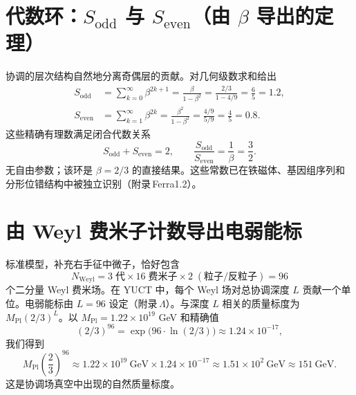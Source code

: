 \documentclass[12pt,a4paper]{article}
\begin{document}
	\section{代数环：\(S_{\mathrm{odd}}\) 与 \(S_{\mathrm{even}}\)（由 \(\beta\) 导出的定理）}
	\label{sec:algebraic-loop}
	
	协调的层次结构自然地分离奇偶层的贡献。对几何级数求和给出
	\begin{align}
		S_{\mathrm{odd}} &= \sum_{k=0}^{\infty} \beta^{2k+1} = \frac{\beta}{1-\beta^{2}} = \frac{2/3}{1 - 4/9} = \frac{6}{5} = 1.2, \label{eq:sodd}\\
		S_{\mathrm{even}} &= \sum_{k=1}^{\infty} \beta^{2k} = \frac{\beta^{2}}{1-\beta^{2}} = \frac{4/9}{5/9} = \frac{4}{5} = 0.8. \label{eq:seven}
	\end{align}
	这些精确有理数满足闭合代数关系
	\begin{equation}
		\boxed{S_{\mathrm{odd}} + S_{\mathrm{even}} = 2, \qquad \frac{S_{\mathrm{odd}}}{S_{\mathrm{even}}} = \frac{1}{\beta} = \frac{3}{2}}.
		\label{eq:algebraic-loop}
	\end{equation}
	无自由参数；该环是 \(\beta = 2/3\) 的直接结果。这些常数已在铁磁体、基因组序列和分形位错结构中被独立识别（附录 Ferra1.2）。
	
	\section{由 Weyl 费米子计数导出电弱能标}
	
	标准模型，补充右手征中微子，恰好包含
	\begin{equation}
		N_{\mathrm{Weyl}} = 3\;\text{代} \times 16\;\text{费米子} \times 2\;(\text{粒子/反粒子}) = 96
	\end{equation}
	个二分量 Weyl 费米场。在 YUCT 中，每个 Weyl 场对总协调深度 \(L\) 贡献一个单位。电弱能标由 \(L = 96\) 设定（附录 \(\Lambda\)）。与深度 \(L\) 相关的质量标度为 \(M_{\mathrm{Pl}} (2/3)^{L}\)。以 \(M_{\mathrm{Pl}} = 1.22 \times 10^{19}\) GeV 和精确值
	\begin{equation}
		(2/3)^{96} = \exp\bigl(96 \cdot \ln(2/3)\bigr) \approx 1.24 \times 10^{-17},
	\end{equation}
	我们得到
	\begin{equation}
		M_{\mathrm{Pl}} \left(\frac{2}{3}\right)^{96} \approx 1.22 \times 10^{19}\ \mathrm{GeV} \times 1.24 \times 10^{-17} \approx 1.51 \times 10^{2}\ \mathrm{GeV} \approx 151\ \mathrm{GeV}.
	\end{equation}
	这是协调场真空中出现的自然质量标度。
	
\end{document}

